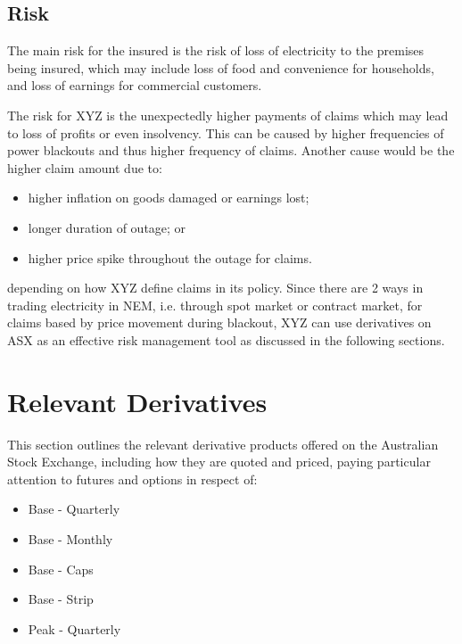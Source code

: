 \documentclass[12pt]{article}
\begin{document}
\subsection{Risk}
\begin{flushleft}
The main risk for the insured is the risk of loss of electricity to the premises being insured, which may include loss of food and convenience for households, and loss of earnings for commercial customers. \par
The risk for XYZ is the unexpectedly higher payments of claims which may lead to loss of profits or even insolvency. This can be caused by higher frequencies of power blackouts and thus higher frequency of claims. Another cause would be the higher claim amount due to:
\begin{itemize}
    \item higher inflation on goods damaged or earnings lost;
    \item longer duration of outage; or
    \item higher price spike throughout the outage for claims.
\end{itemize}
depending on how XYZ define claims in its policy. Since there are 2 ways in trading electricity in NEM, i.e. through spot market or contract market, for claims based by price movement during blackout, XYZ can use derivatives on ASX as an effective risk management tool as discussed in the following sections. 
\end{flushleft}
\newpage


\section{Relevant Derivatives}
\begin{flushleft}
This section outlines the relevant derivative products offered on the Australian Stock Exchange, including how they are quoted and priced, paying particular attention to futures and options in respect of: 
\begin{itemize}
 \item Base - Quarterly
 \item Base - Monthly
 \item Base - Caps
 \item Base - Strip
 \item Peak - Quarterly
\end{itemize}
\end{flushleft}
\end{document}
